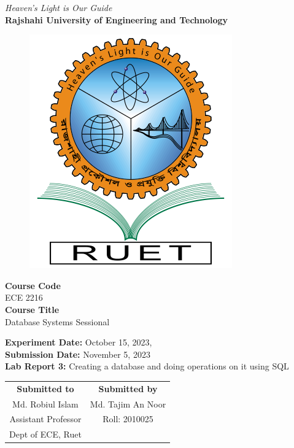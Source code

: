 \vspace*{\fill}
\begin{center}

    \emph{Heaven's Light is Our Guide} \\
    \textbf{Rajshahi University of Engineering and Technology} \\

    \begin{figure}[h]
        \centering
        \includegraphics[scale=.34]{images/RUET_logo.png}
        \label{fig:ruet_logo}
    \end{figure}
    \vspace{5mm}

    \textbf{Course Code}\\
    ECE 2216\\
    \vspace{3mm}
    \textbf{Course Title}\\
    Database Systems Sessional

    \vspace{5mm}
    \textbf{Experiment Date:} October 15, 2023,\\
    \textbf{Submission Date:} November 5, 2023\\

    \vspace{5mm}
    \textbf{Lab Report 3:} Creating a database and doing operations on it using SQL\\

    \vspace{15mm}

    \begin{tabular}{c|c}
        \textbf{Submitted to} & \textbf{Submitted by} \\
        Md. Robiul Islam      & Md. Tajim An Noor     \\
        Assistant Professor   & Roll: 2010025         \\
        Dept of ECE, Ruet     &                       \\
    \end{tabular}

\end{center}
\vspace*{\fill}
